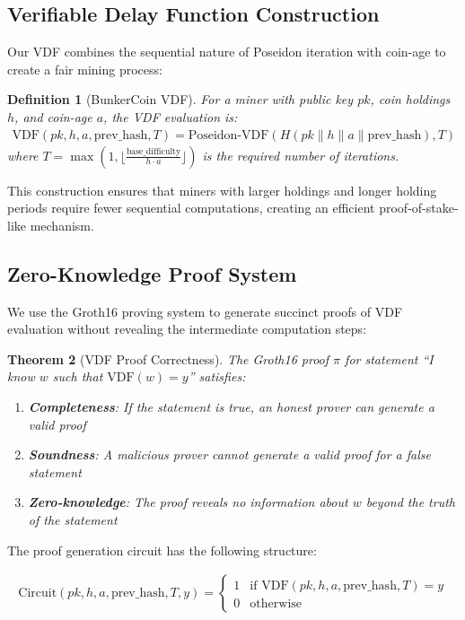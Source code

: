 \documentclass[11pt,a4paper]{article}
\newtheorem{theorem}{Theorem}[section]
\newtheorem{definition}[theorem]{Definition}
\begin{document}
\subsection{Verifiable Delay Function Construction}

Our VDF combines the sequential nature of Poseidon iteration with coin-age to create a fair mining process:

\begin{definition}[BunkerCoin VDF]
For a miner with public key $pk$, coin holdings $h$, and coin-age $a$, the VDF evaluation is:
\begin{align}
\text{VDF}(pk, h, a, \text{prev\_hash}, T) = \text{Poseidon-VDF}(H(pk \| h \| a \| \text{prev\_hash}), T)
\end{align}
where $T = \max(1, \lfloor \frac{\text{base\_difficulty}}{h \cdot a} \rfloor)$ is the required number of iterations.
\end{definition}

This construction ensures that miners with larger holdings and longer holding periods require fewer sequential computations, creating an efficient proof-of-stake-like mechanism.

\subsection{Zero-Knowledge Proof System}

We use the Groth16 proving system to generate succinct proofs of VDF evaluation without revealing the intermediate computation steps:

\begin{theorem}[VDF Proof Correctness]
The Groth16 proof $\pi$ for statement ``I know $w$ such that $\text{VDF}(w) = y$'' satisfies:
\begin{enumerate}
\item \textbf{Completeness}: If the statement is true, an honest prover can generate a valid proof
\item \textbf{Soundness}: A malicious prover cannot generate a valid proof for a false statement
\item \textbf{Zero-knowledge}: The proof reveals no information about $w$ beyond the truth of the statement
\end{enumerate}
\end{theorem}

The proof generation circuit has the following structure:

\begin{align}
\text{Circuit}(pk, h, a, \text{prev\_hash}, T, y) = \begin{cases}
1 & \text{if } \text{VDF}(pk, h, a, \text{prev\_hash}, T) = y \\
0 & \text{otherwise}
\end{cases}
\end{align}
\end{document}
